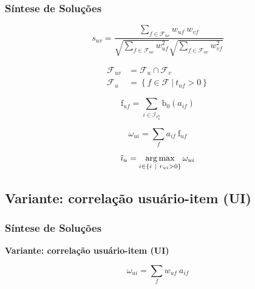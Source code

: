 \begin{frame}
\frametitle{Síntese de Soluções}
\begin{equation}
\label{eq:suv}
    s_{uv} = \frac{\sum\limits_{f \in \mathcal{F}_{uv}}{w_{uf}~w_{vf}}}{\sqrt{\sum\limits_{f \in \mathcal{F}_{uv}
    }w_{uf}^2} \sqrt{\sum\limits_{f \in \mathcal{F}_{uv}}w_{vf}^2}} 
\end{equation} 

\begin{equation}
\label{eq:fuv}
\begin{split}
    \mathcal{F}_{uv} &= \mathcal{F}_u \cap \mathcal{F}_v \\
    \mathcal{F}_u &= \left\{ f \in \mathcal{F}~|~t_{uf} > 0 \right\}
\end{split}    
\end{equation} 



\begin{equation}
\label{eq:frf} 
\mathrm{f}_{uf} = \sum_{i \in \mathcal{I}_{v_k^u}}{\mathrm{b}_0\left(a_{if}\right)}
\end{equation} 


\begin{equation}
\label{eq:wi} 
    \omega_{ui} = \sum_{f}{a_{if}~\mathrm{f}_{uf}}
\end{equation} 

\begin{equation}
\label{eq:iup} 
    \hat{\imath}_u = \operatorname*{arg\,max}_{i \in \left\{i~|~r_{ui} > 0\right\}}{\omega_{ui}}
\end{equation} 
\end{frame}


\subsection{Variante: correlação usuário-item (UI)} %
\label{sub:variante_correla_o_usu_rio_item_}
\begin{frame}
\frametitle{Síntese de Soluções}
\textbf{Variante: correlação usuário-item (UI)}

\begin{equation}
\label{eq:wui} 
    \omega_{ui} = \sum_{f}{w_{uf}~a_{if}}
\end{equation} 
\end{frame}